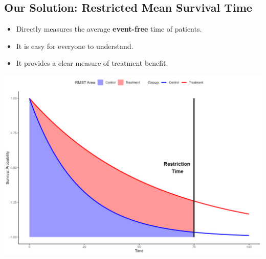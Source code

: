 \documentclass[a0,landscape]{a0poster}
\begin{document}
\begin{minipage}[t]{0.44\linewidth}
    \subsection*{\color{HeadingColor}\Large Our Solution: Restricted Mean Survival Time}
    \begin{itemize}
        \item[{\color{BulletColor}\Large\checkmark}] \Large Directly measures the average \textbf{event-free} time of patients.
        \item[{\color{BulletColor}\Large\checkmark}] \Large It is easy for everyone to understand.
        \item[{\color{BulletColor}\Large\checkmark}] \Large It provides a clear measure of treatment benefit.
    \end{itemize}
  \vspace{0.2cm}    
    {\centering \includegraphics[width=\linewidth]{images/rmst_causal_plot.png}\par}
\end{minipage}
\hfill
\end{document}
